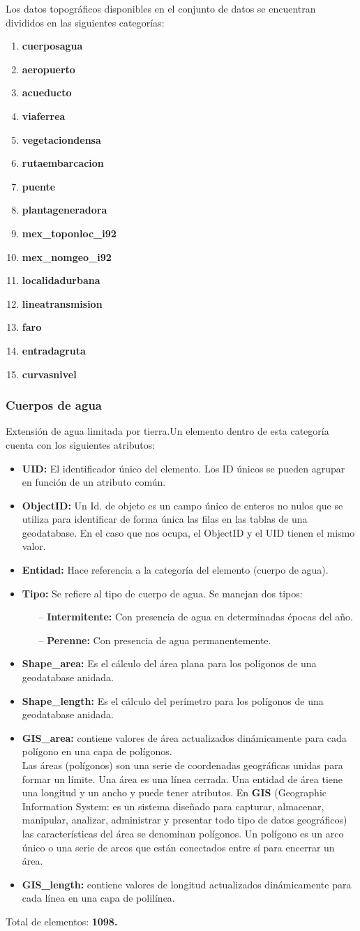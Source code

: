 \documentclass[10pt,letterpaper]{article}
\newcommand{\descripcion}{Un elemento dentro de esta categor\'ia cuenta con los siguientes atributos:}
\newcommand{\total}{Total de elementos: }
\newcommand{\UID}{\textbf{UID:} El identificador \'unico del elemento. Los ID \'unicos se pueden agrupar en funci\'on de un atributo com\'un.}
\newcommand{\OID}{\textbf{ObjectID:} Un Id. de objeto es un campo \'unico de enteros no nulos que se utiliza para identificar de forma \'unica las filas en las tablas de una geodatabase. En el caso que nos ocupa, el ObjectID y el UID tienen el mismo valor.}
\newcommand{\ent}{\textbf{Entidad:} Hace referencia a la categor\'ia del elemento }
\newcommand{\SHA}{\textbf{Shape\_area:} Es el c\'alculo del \'area plana para los pol\'igonos de una geodatabase anidada.}
\newcommand{\SHL}{\textbf{Shape\_length:} Es el c\'alculo del per\'imetro para los pol\'igonos de una geodatabase anidada.}
\newcommand{\GISA}{\textbf{GIS\_area:} contiene valores de \'area actualizados din\'amicamente para cada pol\'igono en una capa de pol\'igonos.}
\newcommand{\GISL}{\textbf{GIS\_length:} contiene valores de longitud actualizados din\'amicamente para cada l\'inea en una capa de polil\'inea.}
\begin{document}
Los datos topogr\'aficos disponibles en el conjunto de datos se encuentran divididos en las siguientes categor\'ias:
\begin{enumerate}
	\item \textbf{cuerposagua}
	\item \textbf{aeropuerto}
	\item \textbf{acueducto}
	\item \textbf{viaferrea}
	\item \textbf{vegetaciondensa}
	\item \textbf{rutaembarcacion}
	\item \textbf{puente}
	\item \textbf{plantageneradora}
	\item \textbf{mex\_toponloc\_i92}
	\item \textbf{mex\_nomgeo\_i92}
	\item \textbf{localidadurbana}
	\item \textbf{lineatransmision}
	\item \textbf{faro}
	\item \textbf{entradagruta}
	\item \textbf{curvasnivel}
\end{enumerate}

\subsubsection{Cuerpos de agua}
Extensi\'on de agua limitada por tierra.\descripcion
\begin{itemize}
	\item \UID
	\item \OID
	\item \ent (cuerpo de agua).
	\item \textbf{Tipo:} Se refiere al tipo de cuerpo de agua. Se manejan dos tipos:
		\begin{itemize}
			\item[--] \textbf{Intermitente:} Con presencia de agua en determinadas \'epocas del a\~no.
			\item[--] \textbf{Perenne:} Con presencia de agua permanentemente.
		\end{itemize}
	\item \SHA
	\item \SHL
	\item \GISA \\
	Las \'areas (pol\'igonos) son una serie de coordenadas geogr\'aficas unidas para formar un l\'imite. Una \'area es una l\'inea cerrada. Una entidad de \'area tiene una longitud y un ancho y puede tener atributos. En \textbf{GIS} (Geographic Information System: es un sistema dise\~nado para capturar, almacenar, manipular, analizar, administrar y presentar todo tipo de datos geogr\'aficos) las caracter\'isticas del \'area se denominan pol\'igonos. Un pol\'igono es un arco \'unico o una serie de arcos que est\'an conectados entre s\'i para encerrar un \'area.
	\item \GISL
\end{itemize}
\total \textbf{1098.}
\end{document}
